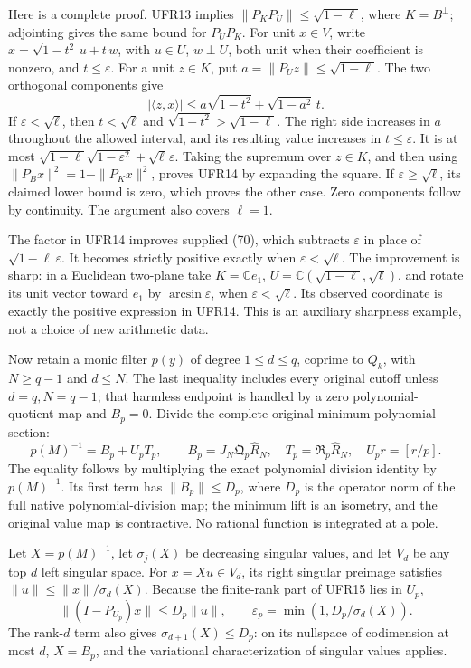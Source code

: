 \documentclass[11pt]{article}
\begin{document}
Here is a complete proof. UFR13 implies \(\|P_KP_U\|\le\sqrt{1-\ell}\), where \(K=B^\perp\); adjointing gives the same bound for \(P_UP_K\). For unit \(x\in V\), write \(x=\sqrt{1-t^2}\,u+t\,w\), with \(u\in U\), \(w\perp U\), both unit when their coefficient is nonzero, and \(t\le\varepsilon\). For a unit \(z\in K\), put \(a=\|P_Uz\|\le\sqrt{1-\ell}\). The two orthogonal components give \[
|\langle z,x\rangle|
\le a\sqrt{1-t^2}+\sqrt{1-a^2}\,t.
\] If \(\varepsilon<\sqrt\ell\), then \(t<\sqrt\ell\) and \(\sqrt{1-t^2}>\sqrt{1-\ell}\). The right side increases in \(a\) throughout the allowed interval, and its resulting value increases in \(t\le\varepsilon\). It is at most \(\sqrt{1-\ell}\sqrt{1-\varepsilon^2}+\sqrt\ell\,\varepsilon\). Taking the supremum over \(z\in K\), and then using \(\|P_Bx\|^2=1-\|P_Kx\|^2\), proves UFR14 by expanding the square. If \(\varepsilon\ge\sqrt\ell\), its claimed lower bound is zero, which proves the other case. Zero components follow by continuity. The argument also covers \(\ell=1\).

The factor in UFR14 improves supplied (70), which subtracts \(\varepsilon\) in place of \(\sqrt{1-\ell}\varepsilon\). It becomes strictly positive exactly when \(\varepsilon<\sqrt\ell\). The improvement is sharp: in a Euclidean two-plane take \(K=\mathbb Ce_1\), \(U=\mathbb C(\sqrt{1-\ell},\sqrt\ell)\), and rotate its unit vector toward \(e_1\) by \(\arcsin\varepsilon\), when \(\varepsilon<\sqrt\ell\). Its observed coordinate is exactly the positive expression in UFR14. This is an auxiliary sharpness example, not a choice of new arithmetic data.

Now retain a monic filter \(p(y)\) of degree \(1\le d\le q\), coprime to \(Q_k\), with \(N\ge q-1\) and \(d\le N\). The last inequality includes every original cutoff unless \(d=q,N=q-1\); that harmless endpoint is handled by a zero polynomial-quotient map and \(B_p=0\). Divide the complete original minimum polynomial section: \[
p(M)^{-1}=B_p+U_pT_p,\qquad
B_p=J_N\mathfrak Q_p\widehat R_N,\quad
T_p=\mathfrak R_p\widehat R_N,\quad U_pr=[r/p].
\tag{UFR15}
\] The equality follows by multiplying the exact polynomial division identity by \(p(M)^{-1}\). Its first term has \(\|B_p\|\le D_p\), where \(D_p\) is the operator norm of the full native polynomial-division map; the minimum lift is an isometry, and the original value map is contractive. No rational function is integrated at a pole.

Let \(X=p(M)^{-1}\), let \(\sigma_j(X)\) be decreasing singular values, and let \(V_d\) be any top \(d\) left singular space. For \(x=Xu\in V_d\), its right singular preimage satisfies \(\|u\|\le\|x\|/\sigma_d(X)\). Because the finite-rank part of UFR15 lies in \(U_p\), \[
\|(I-P_{U_p})x\|\le D_p\|u\|,\qquad
\varepsilon_p=\min(1,D_p/\sigma_d(X)).
\] The rank-\(d\) term also gives \(\sigma_{d+1}(X)\le D_p\): on its nullspace of codimension at most \(d\), \(X=B_p\), and the variational characterization of singular values applies.
\end{document}
